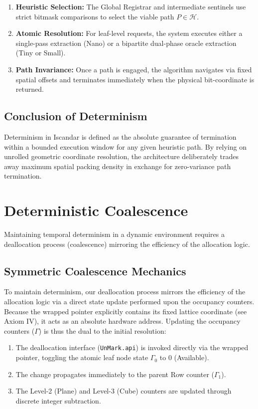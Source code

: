 \documentclass[11pt]{article}
\begin{document}
\begin{enumerate}
    \item \textbf{Heuristic Selection:} The Global Registrar and intermediate sentinels use strict bitmask comparisons to select the viable path $P \in \mathcal{H}$.
    \item \textbf{Atomic Resolution:} For leaf-level requests, the system executes either a single-pass extraction (Nano) or a bipartite dual-phase oracle extraction (Tiny or Small).
    \item \textbf{Path Invariance:} Once a path is engaged, the algorithm navigates via fixed spatial offsets and terminates immediately when the physical bit-coordinate is returned.
\end{enumerate}

\subsection{Conclusion of Determinism}
Determinism in Iscandar is defined as the absolute guarantee of termination within a bounded execution window for any given heuristic path. By relying on unrolled geometric coordinate resolution, the architecture deliberately trades away maximum spatial packing density in exchange for zero-variance path termination.

\section{Deterministic Coalescence}
Maintaining temporal determinism in a dynamic environment requires a deallocation process (coalescence) mirroring the efficiency of the allocation logic. 

\subsection{Symmetric Coalescence Mechanics}

To maintain determinism, our deallocation process mirrors the efficiency of the allocation logic via a direct state update performed upon the occupancy counters. Because the wrapped pointer explicitly contains its fixed lattice coordinate (see Axiom IV), it acts as an absolute hardware address. Updating the occupancy counters ($\Gamma$) is thus the dual to the initial resolution:

\begin{enumerate}
    \item The deallocation interface (\texttt{UnMark.api}) is invoked directly via the wrapped pointer, toggling the atomic leaf node state $\Gamma_0$ to 0 (Available).
    \item The change propagates immediately to the parent Row counter ($\Gamma_1$).
    \item The Level-2 (Plane) and Level-3 (Cube) counters are updated through discrete integer subtraction.
\end{enumerate}
\end{document}
